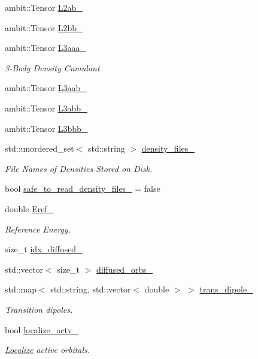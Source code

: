 \begin{DoxyCompactItemize}
ambit\+::\+Tensor \mbox{\hyperlink{classforte_1_1_f_c_i___m_o_a4e1f7bf22546733da012661e771b7980}{L2ab\+\_\+}}
\item 
ambit\+::\+Tensor \mbox{\hyperlink{classforte_1_1_f_c_i___m_o_a69431a24b140c370eeca7411f7c31db9}{L2bb\+\_\+}}
\item 
ambit\+::\+Tensor \mbox{\hyperlink{classforte_1_1_f_c_i___m_o_a62badb23a728871de07c2766206f9e02}{L3aaa\+\_\+}}
\begin{DoxyCompactList}\small\item\em 3-\/\+Body Density Cumulant \end{DoxyCompactList}\item 
ambit\+::\+Tensor \mbox{\hyperlink{classforte_1_1_f_c_i___m_o_a866dfda1b8df28bab34b98599a664e63}{L3aab\+\_\+}}
\item 
ambit\+::\+Tensor \mbox{\hyperlink{classforte_1_1_f_c_i___m_o_afb86c338b1ea0fe47f19a55ae4cb257c}{L3abb\+\_\+}}
\item 
ambit\+::\+Tensor \mbox{\hyperlink{classforte_1_1_f_c_i___m_o_a7886e7c6dce38ca1dcb109b4cd58e154}{L3bbb\+\_\+}}
\item 
std\+::unordered\+\_\+set$<$ std\+::string $>$ \mbox{\hyperlink{classforte_1_1_f_c_i___m_o_a63cbb38c3d84198962dbfa8be57287be}{density\+\_\+files\+\_\+}}
\begin{DoxyCompactList}\small\item\em File Names of Densities Stored on Disk. \end{DoxyCompactList}\item 
bool \mbox{\hyperlink{classforte_1_1_f_c_i___m_o_a583a12563a50064d5942e8ed68f48663}{safe\+\_\+to\+\_\+read\+\_\+density\+\_\+files\+\_\+}} = false
\item 
double \mbox{\hyperlink{classforte_1_1_f_c_i___m_o_aa9d28f4849e303edc518336727e51ff5}{Eref\+\_\+}}
\begin{DoxyCompactList}\small\item\em Reference Energy. \end{DoxyCompactList}\item 
size\+\_\+t \mbox{\hyperlink{classforte_1_1_f_c_i___m_o_a4bf28fb07e58c0ba35f42877258b20b9}{idx\+\_\+diffused\+\_\+}}
\item 
std\+::vector$<$ size\+\_\+t $>$ \mbox{\hyperlink{classforte_1_1_f_c_i___m_o_a0dfea7e88032d424c7431e3dd9194c71}{diffused\+\_\+orbs\+\_\+}}
\item 
std\+::map$<$ std\+::string, std\+::vector$<$ double $>$ $>$ \mbox{\hyperlink{classforte_1_1_f_c_i___m_o_a0d7fcb57822cb9a47e7816046c799084}{trans\+\_\+dipole\+\_\+}}
\begin{DoxyCompactList}\small\item\em Transition dipoles. \end{DoxyCompactList}\item 
bool \mbox{\hyperlink{classforte_1_1_f_c_i___m_o_a847460b619ff3256cb8d3419a044661c}{localize\+\_\+actv\+\_\+}}
\begin{DoxyCompactList}\small\item\em \mbox{\hyperlink{classforte_1_1_localize}{Localize}} active orbitals. \end{DoxyCompactList}\end{DoxyCompactItemize}


